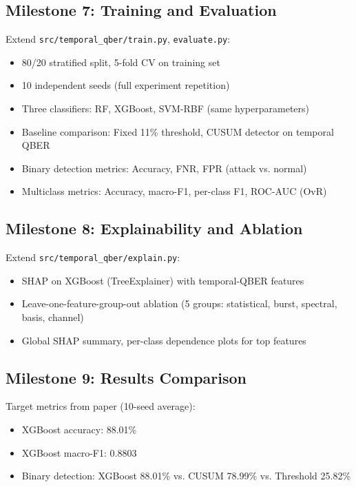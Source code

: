 \subsection{Milestone 7: Training and Evaluation}
\label{milestone:training}
Extend \texttt{src/temporal\_qber/train.py}, \texttt{evaluate.py}:
\begin{itemize}
    \item 80/20 stratified split, 5-fold CV on training set
    \item 10 independent seeds (full experiment repetition)
    \item Three classifiers: RF, XGBoost, SVM-RBF (same hyperparameters)
    \item Baseline comparison: Fixed 11\% threshold, CUSUM detector on temporal QBER
    \item Binary detection metrics: Accuracy, FNR, FPR (attack vs. normal)
    \item Multiclass metrics: Accuracy, macro-F1, per-class F1, ROC-AUC (OvR)
\end{itemize}

\subsection{Milestone 8: Explainability and Ablation}
\label{milestone:explain}
Extend \texttt{src/temporal\_qber/explain.py}:
\begin{itemize}
    \item SHAP on XGBoost (TreeExplainer) with temporal-QBER features
    \item Leave-one-feature-group-out ablation (5 groups: statistical, burst, spectral, basis, channel)
    \item Global SHAP summary, per-class dependence plots for top features
\end{itemize}

\subsection{Milestone 9: Results Comparison}
\label{milestone:comparison}
Target metrics from paper (10-seed average):
\begin{itemize}
    \item XGBoost accuracy: 88.01\%
    \item XGBoost macro-F1: 0.8803
    \item Binary detection: XGBoost 88.01\% vs. CUSUM 78.99\% vs. Threshold 25.82\%
\end{itemize}

